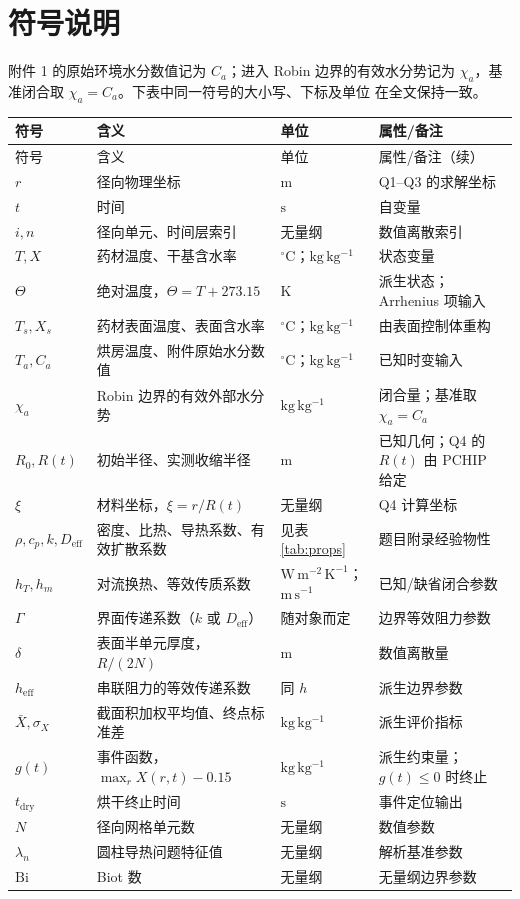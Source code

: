 \documentclass[withoutpreface,bwprint]{cumcmthesis}
\begin{document}
\section{符号说明}

附件 1 的原始环境水分数值记为 $C_a$；进入 Robin 边界的有效水分势记为
$\chi_a$，基准闭合取 $\chi_a=C_a$。下表中同一符号的大小写、下标及单位
在全文保持一致。

{\renewcommand{\arraystretch}{1.12}
\begin{longtable}{@{}p{}p{}p{}p{}@{}}
\toprule
符号 & 含义 & 单位 & 属性/备注 \\
\midrule
\endfirsthead
\toprule
符号 & 含义 & 单位 & 属性/备注（续） \\
\midrule
\endhead
\bottomrule
\endfoot
\bottomrule
\endlastfoot
$r$ & 径向物理坐标 & $\mathrm{m}$ & Q1--Q3 的求解坐标 \\
$t$ & 时间 & $\mathrm{s}$ & 自变量 \\
$i,n$ & 径向单元、时间层索引 & 无量纲 & 数值离散索引 \\
$T,X$ & 药材温度、干基含水率 & $^\circ\mathrm{C}$；$\mathrm{kg\,kg^{-1}}$ & 状态变量 \\
$\Theta$ & 绝对温度，$\Theta=T+273.15$ & $\mathrm{K}$ & 派生状态；Arrhenius 项输入 \\
$T_s,X_s$ & 药材表面温度、表面含水率 & $^\circ\mathrm{C}$；$\mathrm{kg\,kg^{-1}}$ & 由表面控制体重构 \\
$T_a,C_a$ & 烘房温度、附件原始水分数值 & $^\circ\mathrm{C}$；$\mathrm{kg\,kg^{-1}}$ & 已知时变输入 \\
$\chi_a$ & Robin 边界的有效外部水分势 & $\mathrm{kg\,kg^{-1}}$ & 闭合量；基准取 $\chi_a=C_a$ \\
$R_0,R(t)$ & 初始半径、实测收缩半径 & $\mathrm{m}$ & 已知几何；Q4 的 $R(t)$ 由 PCHIP 给定 \\
$\xi$ & 材料坐标，$\xi=r/R(t)$ & 无量纲 & Q4 计算坐标 \\
$\rho,c_p,k,D_{\mathrm{eff}}$ & 密度、比热、导热系数、有效扩散系数 & 见表 \ref{tab:props} & 题目附录经验物性 \\
$h_T,h_m$ & 对流换热、等效传质系数 & $\mathrm{W\,m^{-2}\,K^{-1}}$；$\mathrm{m\,s^{-1}}$ & 已知/缺省闭合参数 \\
$\Gamma$ & 界面传递系数（$k$ 或 $D_{\mathrm{eff}}$） & 随对象而定 & 边界等效阻力参数 \\
$\delta$ & 表面半单元厚度，$R/(2N)$ & $\mathrm{m}$ & 数值离散量 \\
$h_{\mathrm{eff}}$ & 串联阻力的等效传递系数 & 同 $h$ & 派生边界参数 \\
$\bar X,\sigma_X$ & 截面积加权平均值、终点标准差 & $\mathrm{kg\,kg^{-1}}$ & 派生评价指标 \\
$g(t)$ & 事件函数，$\max_rX(r,t)-0.15$ & $\mathrm{kg\,kg^{-1}}$ & 派生约束量；$g(t)\le0$ 时终止 \\
$t_{\mathrm{dry}}$ & 烘干终止时间 & $\mathrm{s}$ & 事件定位输出 \\
$N$ & 径向网格单元数 & 无量纲 & 数值参数 \\
$\lambda_n$ & 圆柱导热问题特征值 & 无量纲 & 解析基准参数 \\
$\mathrm{Bi}$ & Biot 数 & 无量纲 & 无量纲边界参数 \\
\end{longtable}
}
\end{document}
